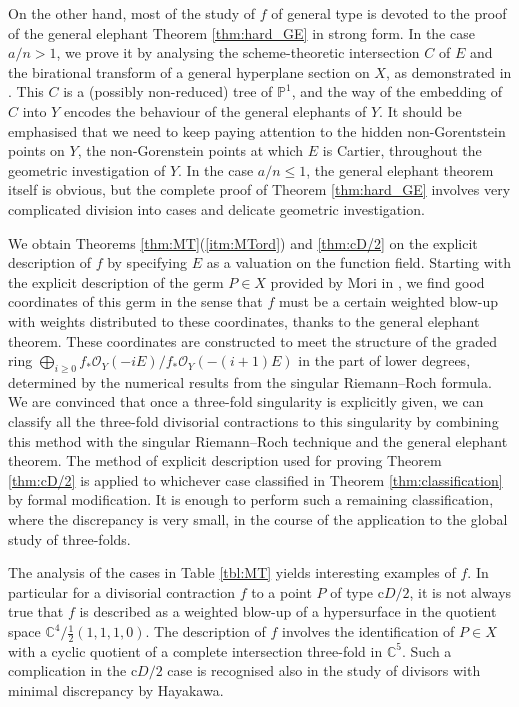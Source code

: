 \documentclass[a4paper,11pt]{amsart}
\theoremstyle{definition}
\theoremstyle{remark}
\numberwithin{equation}{section}
\newcommand{\bC}{{\mathbb C}}
\newcommand{\bP}{{\mathbb P}}
\newcommand{\cO}{{\mathcal O}}
\begin{document}
On the other hand,
most of the study of $f$ of general type is devoted to
the proof of the general elephant Theorem \ref{thm:hard_GE} in strong form.
In the case $a/n>1$,
we prove it by analysing the scheme-theoretic intersection $C$
of $E$ and the birational transform of a general hyperplane section on $X$,
as demonstrated in \cite{Ka03}.
This $C$ is a (possibly non-reduced) tree of $\bP^1$,
and the way of the embedding of $C$ into $Y$ encodes
the behaviour of the general elephants of $Y$.
It should be emphasised that we need to keep paying attention to
the hidden non-Gorentstein points on $Y$,
the non-Gorenstein points at which $E$ is Cartier,
throughout the geometric investigation of $Y$.
In the case $a/n\le1$,
the general elephant theorem itself is obvious,
but the complete proof of Theorem \ref{thm:hard_GE} involves
very complicated division into cases and
delicate geometric investigation.

We obtain Theorems \ref{thm:MT}(\ref{itm:MTord}) and \ref{thm:cD/2}
on the explicit description of $f$
by specifying $E$ as a valuation on the function field.
Starting with the explicit description of the germ $P \in X$
provided by Mori in \cite{Mo85},
we find good coordinates of this germ in the sense
that $f$ must be a certain weighted blow-up
with weights distributed to these coordinates,
thanks to the general elephant theorem.
These coordinates are constructed to meet the structure of the graded ring
$\bigoplus_{i\ge0} f_*\cO_Y(-iE)/f_*\cO_Y(-(i+1)E)$
in the part of lower degrees,
determined by the numerical results from the singular Riemann--Roch formula.
We are convinced that once a three-fold singularity is explicitly given,
we can classify all the three-fold divisorial contractions to this singularity
by combining this method with
the singular Riemann--Roch technique and the general elephant theorem.
The method of explicit description used for proving Theorem \ref{thm:cD/2}
is applied to whichever case classified in Theorem \ref{thm:classification}
by formal modification.
It is enough to perform such a remaining classification,
where the discrepancy is very small,
in the course of the application to the global study of three-folds.

The analysis of the cases in Table \ref{tbl:MT} yields
interesting examples of $f$.
In particular for a divisorial contraction $f$ to a point $P$ of type c$D/2$,
it is not always true that $f$ is described
as a weighted blow-up of a hypersurface
in the quotient space $\bC^4/\frac{1}{2}(1,1,1,0)$.
The description of $f$ involves the identification of $P \in X$
with a cyclic quotient of a complete intersection three-fold in $\bC^5$.
Such a complication in the c$D/2$ case is recognised
also in the study \cite{Ha00} of divisors with minimal discrepancy by Hayakawa.
\end{document}
